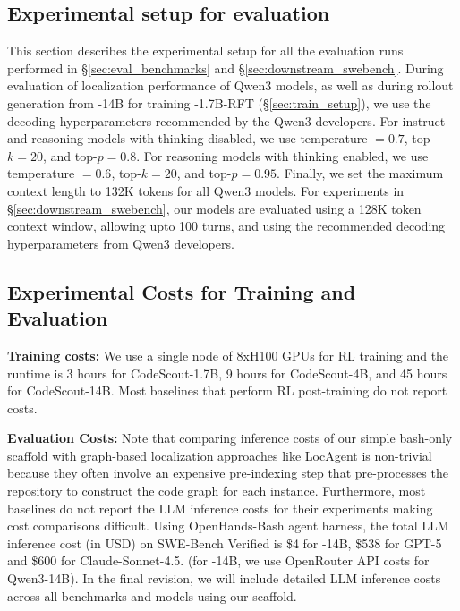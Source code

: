 \subsection{Experimental setup for evaluation}\label{appendix:eval_hyperparams}
This section describes the experimental setup for all the evaluation runs performed in \S\ref{sec:eval_benchmarks} and \S\ref{sec:downstream_swebench}.  During evaluation of localization performance of Qwen3 models, as well as during rollout generation from \methodname-14B for training \methodname-1.7B-RFT (\S\ref{sec:train_setup}), we use the decoding hyperparameters recommended by the Qwen3 developers. For instruct and reasoning models with thinking disabled, we use temperature $=0.7$, top-$k=20$, and top-$p=0.8$. For reasoning models with thinking enabled, we use temperature $=0.6$, top-$k=20$, and top-$p=0.95$. Finally, we set the maximum context length to 132K tokens for all Qwen3 models. For experiments in \S\ref{sec:downstream_swebench}, our models are evaluated using a 128K token context window, allowing upto 100 turns, and using the recommended decoding hyperparameters from Qwen3 developers.

\subsection{Experimental Costs for Training and Evaluation}
\textbf{Training costs:} We use a single node of 8xH100 GPUs for RL training and the runtime is 3 hours for CodeScout-1.7B, 9 hours for CodeScout-4B, and 45 hours for CodeScout-14B. Most baselines that perform RL post-training do not report costs. 

\textbf{Evaluation Costs: } Note that comparing inference costs of our simple bash-only scaffold with graph-based localization approaches like LocAgent \citep{chen-etal-2025-locagent} is non-trivial because they often involve an expensive pre-indexing step that pre-processes the repository to construct the code graph for each instance. Furthermore, most baselines do not report the LLM inference costs for their experiments making cost comparisons difficult. Using OpenHands-Bash agent harness, the total LLM inference cost (in USD) on SWE-Bench Verified is \$4 for \methodname-14B, \$538 for GPT-5 and \$600 for Claude-Sonnet-4.5. (for \methodname-14B, we use OpenRouter API costs for Qwen3-14B). In the final revision, we will include detailed LLM inference costs across all benchmarks and models using our scaffold.

